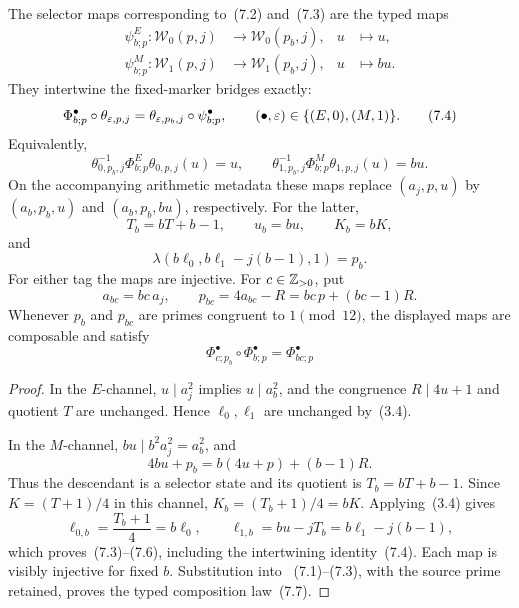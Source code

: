 \begin{proposition}
The selector maps corresponding to~(7.2) and~(7.3) are the typed maps
\begin{align*}
 \psi_{b;p}^E:\mathcal W_0(p,j)&\longrightarrow\mathcal W_0(p_b,j),
 &u&\longmapsto u,\\
 \psi_{b;p}^M:\mathcal W_1(p,j)&\longrightarrow\mathcal W_1(p_b,j),
 &u&\longmapsto bu.
\end{align*}
They intertwine the fixed-marker bridges exactly:
\begin{equation}
 \Phi_{b;p}^\bullet\circ\theta_{\varepsilon,p,j}
 =\theta_{\varepsilon,p_b,j}\circ\psi_{b;p}^\bullet,
 \qquad
 (\bullet,\varepsilon)\in\{(E,0),(M,1)\}.                         \tag{7.4}
\end{equation}
Equivalently,
\[
 \theta_{0,p_b,j}^{-1}\Phi_{b;p}^E\theta_{0,p,j}(u)=u,
 \qquad
 \theta_{1,p_b,j}^{-1}\Phi_{b;p}^M\theta_{1,p,j}(u)=bu.
\]
On the accompanying arithmetic metadata these maps replace
\((a_j,p,u)\) by \((a_b,p_b,u)\) and \((a_b,p_b,bu)\), respectively.
For the latter,
\begin{equation}
 T_b=bT+b-1,
 \qquad u_b=bu,
 \qquad K_b=bK,                                              \tag{7.5}
\end{equation}
and
\begin{equation}
 \lambda(b\ell_0,b\ell_1-j(b-1),1)=p_b.                    \tag{7.6}
\end{equation}
For either tag the maps are injective.  For \(c\in\mathbb Z_{>0}\), put
\[
 a_{bc}=bc\,a_j,
 \qquad
 p_{bc}=4a_{bc}-R=bc\,p+(bc-1)R.
\]
Whenever \(p_b\) and \(p_{bc}\) are primes congruent to \(1\pmod {12}\),
the displayed maps are composable and satisfy
\begin{equation}
 \Phi_{c;p_b}^\bullet\circ\Phi_{b;p}^\bullet
 =\Phi_{bc;p}^\bullet                                      \tag{7.7}
\end{equation}
\end{proposition}

\begin{proof}
In the \(E\)-channel, \(u\mid a_j^2\) implies \(u\mid a_b^2\), and the
congruence \(R\mid4u+1\) and quotient \(T\) are unchanged.  Hence
\(\ell_0,\ell_1\) are unchanged by~(3.4).

In the \(M\)-channel, \(bu\mid b^2a_j^2=a_b^2\), and
\[
 4bu+p_b=b(4u+p)+(b-1)R.
\]
Thus the descendant is a selector state and its quotient is
\(T_b=bT+b-1\).  Since \(K=(T+1)/4\) in this channel,
\(K_b=(T_b+1)/4=bK\).  Applying~(3.4) gives
\[
 \ell_{0,b}=\frac{T_b+1}{4}=b\ell_0,
 \qquad
 \ell_{1,b}=bu-jT_b=b\ell_1-j(b-1),
\]
which proves~(7.3)--(7.6), including the intertwining identity~(7.4).
Each map is visibly injective for fixed \(b\).  Substitution into
~(7.1)--(7.3), with the source prime retained, proves the typed composition
law~(7.7).
\end{proof}

